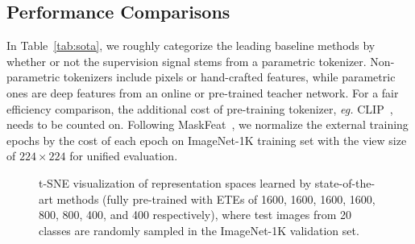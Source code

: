 \documentclass[lettersize,journal]{IEEEtran}
\begin{document}
\subsection{Performance Comparisons}
In Table~\ref{tab:sota}, we roughly categorize the leading baseline methods by whether or not the supervision signal stems from a parametric tokenizer. 
Non-parametric tokenizers include pixels or hand-crafted features, while parametric ones are deep features from an online or pre-trained teacher network.
For a fair efficiency comparison, the additional cost of pre-training tokenizer, \textit{eg.}  CLIP~\cite{Radford2021LearningTV}, needs to be counted on. 
Following MaskFeat~\cite{2021arXiv211209133W}, we normalize the external training epochs by the cost of each epoch on ImageNet-1K training set with the view size of $224 \times 224$ for unified evaluation.

\begin{figure*}[!t]
\centering
	\hfill
	\hfill
    \hfill	
    \quad
	\hfill
	\hfill
    \hfill	
\caption{t-SNE visualization of representation spaces learned by state-of-the-art methods (fully pre-trained with ETEs of 1600, 1600, 1600, 1600, 800, 800, 400, and 400 respectively), where test images from 20 classes are randomly sampled in the ImageNet-1K validation set.}
\label{fig:tsne}
\end{figure*}
\end{document}
